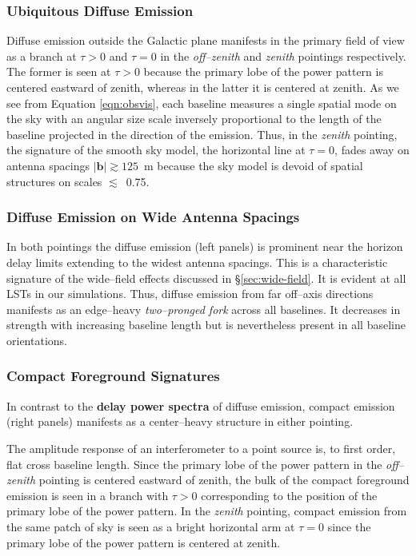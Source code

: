 \documentclass[preprint2,iop,numberedappendix]{emulateapj}
\begin{document}
\subsubsection{Ubiquitous Diffuse Emission}\label{sec:diffuse-features}

Diffuse emission outside the Galactic plane manifests in the primary field of view as a branch at $\tau>0$ and $\tau=0$ in the {\it off--zenith} and {\it zenith} pointings respectively. The former is seen at $\tau>0$ because the primary lobe of the power pattern is centered eastward of zenith, whereas in the latter it is centered at zenith. As we see from Equation \ref{eqn:obsvis}, each baseline measures a single spatial mode on the sky with an angular size scale inversely proportional to the length of the baseline projected in the direction of the emission. Thus, in the {\it zenith} pointing, the signature of the smooth sky model, the horizontal line at $\tau=0$, fades away on antenna spacings $|\boldsymbol{b}| \gtrsim 125$~m because the sky model is devoid of spatial structures on scales $\lesssim$~0.75\arcdeg. 

\subsubsection{Diffuse Emission on Wide Antenna Spacings}\label{sec:diffuse-long-baselines}

In both pointings the diffuse emission (left panels) is prominent near the horizon delay limits extending to the widest antenna spacings. This is a characteristic signature of the wide--field effects discussed in \S\ref{sec:wide-field}. It is evident at all LSTs in our simulations. Thus, diffuse emission from far off--axis directions manifests as an edge--heavy {\it two--pronged fork} across all baselines. It decreases in strength with increasing baseline length but is nevertheless present in all baseline orientations.   

\subsubsection{Compact Foreground Signatures}\label{sec:compact}

In contrast to the {\bf delay power spectra} of diffuse emission, compact emission (right panels) manifests as a center--heavy structure in either pointing. 

The amplitude response of an interferometer to a point source is, to first order, flat cross baseline length. Since the primary lobe of the power pattern in the {\it off--zenith} pointing is centered eastward of zenith, the bulk of the compact foreground emission is seen in a branch with $\tau>0$ corresponding to the position of the primary lobe of the power pattern. In the {\it zenith} pointing, compact emission from the same patch of sky is seen as a bright horizontal arm at $\tau=0$ since the primary lobe of the power pattern is centered at zenith. 
\end{document}
